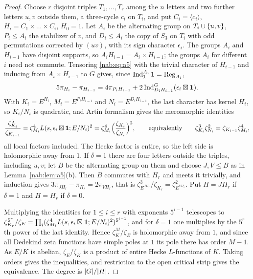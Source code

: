 \begin{proof}
Choose $r$ disjoint triples $T_1,\dots,T_r$ among the $n$ letters and two further letters
$u,v$ outside them, a three-cycle $c_i$ on $T_i$, and put $C_i=\langle c_i\rangle$,
$H_i=C_1\times\dots\times C_i$, $H_0=1$. Let $A_i$ be the alternating group on
$T_i\cup\{u,v\}$, $P_i\le A_i$ the stabilizer of $v$, and $D_i\le A_i$ the copy of $S_3$ on
$T_i$ with odd permutations corrected by $(uv)$, with its sign character $\epsilon_i$. The
groups $A_i$ and $H_{i-1}$ have disjoint supports, so $A_iH_{i-1}=A_i\times H_{i-1}$; the
groups $A_i$ for different $i$ need not commute. Tensoring \eqref{nab:eq:a5} with the trivial
character of $H_{i-1}$ and inducing from $A_i\times H_{i-1}$ to $G$ gives, since
$\operatorname{Ind}_1^{A_i}\mathbf{1}=\operatorname{Reg}_{A_i}$,
\begin{equation}\label{nab:eq:iter}
 5\pi_{H_i}-\pi_{H_{i-1}}=4\pi_{P_iH_{i-1}}+2\operatorname{Ind}_{D_iH_{i-1}}^G(\epsilon_i\boxtimes\mathbf{1}) .
\end{equation}
With $K_i=E^{H_i}$, $M_i=E^{P_iH_{i-1}}$ and $N_i=E^{D_iH_{i-1}}$, the last character has
kernel $H_i$, so $K_i/N_i$ is quadratic, and Artin formalism gives the meromorphic identities
\[
 \frac{\zeta_{K_i}^5}{\zeta_{K_{i-1}}}=\zeta_{M_i}^4L(s,\epsilon_i\boxtimes\mathbf{1};E/N_i)^2
 =\zeta_{M_i}^4\Bigl(\frac{\zeta_{K_i}}{\zeta_{N_i}}\Bigr)^2,
 \qquad\text{equivalently}\qquad
 \zeta_{K_i}^3\zeta_{N_i}^2=\zeta_{K_{i-1}}\zeta_{M_i}^4 ,
\]
all local factors included. The Hecke factor is entire, so the left side is holomorphic away
from $1$. If $\delta=1$ there are four letters outside the triples, including $u,v$; let $B$
be the alternating group on them and choose $J,V\le B$ as in Lemma~\ref{nab:lem:a5}(b). Then
$B$ commutes with $H_r$ and meets it trivially, and induction gives
$3\pi_{JH_r}-\pi_{H_r}=2\pi_{VH_r}$, that is $\zeta_{E^{JH_r}}^3/\zeta_{K_r}=\zeta_{E^{VH_r}}^2$. Put
$H=JH_r$ if $\delta=1$ and $H=H_r$ if $\delta=0$.

Multiplying the identities for $1\le i\le r$ with exponents $5^{i-1}$ telescopes to
$\zeta_{K_r}^{5^r}/\zeta_E=\prod_i(\zeta_{M_i}^4L(s,\epsilon_i\boxtimes\mathbf{1};E/N_i)^2)^{5^{i-1}}$, and
for $\delta=1$ one multiplies by the $5^r$th power of the last identity. Hence $\zeta_K^M/\zeta_E$
is holomorphic away from $1$, and since all Dedekind zeta functions have simple poles at
$1$ its pole there has order $M-1$. As $E/K$ is abelian, $\zeta_E/\zeta_K$ is a product of
entire Hecke $L$-functions of $K$. Taking orders gives the inequalities, and restriction to
the open critical strip gives the equivalence. The degree is $\lvert G\rvert/\lvert H\rvert$.
\end{proof}

